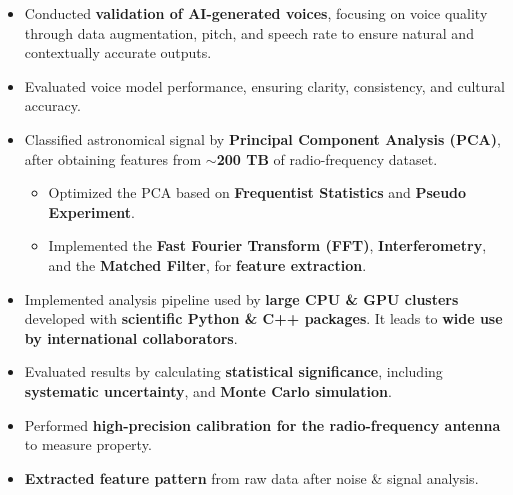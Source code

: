 \documentclass[10pt,a4paper,ragged2e,withhyper]{altacv}
\begin{document}

\begin{itemize}
\item Conducted {\bf validation of AI-generated voices}, focusing on voice quality through data augmentation, pitch, and speech rate to ensure natural and contextually accurate outputs.
\item Evaluated voice model performance, ensuring clarity, consistency, and cultural accuracy.
\end{itemize}
\divider


\begin{itemize}
\item Classified astronomical signal by {\bf Principal Component Analysis (PCA)}, after obtaining features from {\bf ${\sim}$200 TB} of radio-frequency dataset. 
\begin{itemize}
\item Optimized the PCA based on {\bf Frequentist Statistics} and {\bf Pseudo Experiment}.
\item Implemented the {\bf Fast Fourier Transform (FFT)}, {\bf Interferometry}, and the {\bf Matched Filter}, for {\bf feature extraction}.
\end{itemize}
\item Implemented analysis pipeline used by {\bf large CPU \& GPU clusters} developed with {\bf scientific Python \& C++ packages}. It leads to {\bf wide use by international collaborators}.
\item Evaluated results by calculating {\bf statistical significance}, including {\bf systematic uncertainty}, and {\bf Monte Carlo simulation}.
\end{itemize}
\begin{itemize}
\item Performed {\bf high-precision calibration for the radio-frequency antenna} to measure property.
\item {\bf Extracted feature pattern} from raw data after noise \& signal analysis.
\end{itemize}
\divider
\end{document}
